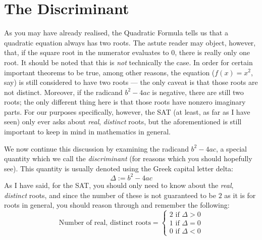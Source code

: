 \documentclass{article}
\begin{document}
	
	\section*{The Discriminant}
	As you may have already realised, the Quadratic Formula tells us that a quadratic equation always has two roots. The astute reader may object, however, that, if the square root in the numerator evaluates to $0$, there is really only one root. It should be noted that this is \textit{not} technically the case. In order for certain important theorems to be true, among other reasons, the equation ($f(x)=x^2$, say) is still considered to have two roots --- the only caveat is that those roots are not distinct. Moreover, if the radicand $b^2-4ac$ is negative, there are still two roots; the only different thing here is that those roots have nonzero imaginary parts. For our purposes specifically, however, the SAT (at least, as far as I have seen) only ever asks about \textit{real}, \textit{distinct} roots, but the aforementioned is still important to keep in mind in mathematics in general.
	
	We now continue this discussion by examining the radicand $b^2-4ac$, a special quantity which we call the \textit{discriminant} (for reasons which you should hopefully see). This quantity is usually denoted using the Greek capital letter delta:
	\[\Delta := b^2-4ac\]
	As I have said, for the SAT, you should only need to know about the \textit{real}, \textit{distinct} roots, and since the number of these is not guaranteed to be $2$ as it is for roots in general, you should reason through and remember the following:
	\[
	\text{Number of real, distinct roots} =
	\begin{cases}
		2 \text{ if } \Delta > 0 \\
		1 \text{ if } \Delta = 0 \\
		0 \text{ if } \Delta < 0
	\end{cases}
	\]
\end{document}
